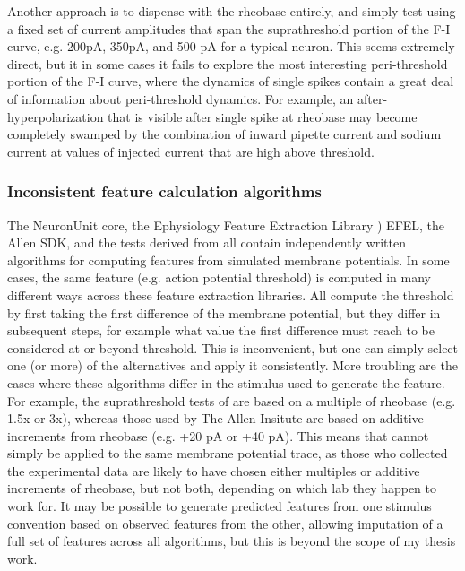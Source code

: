 Another approach is to dispense with the rheobase entirely, and simply test using a fixed set of current amplitudes that span the suprathreshold portion of the F-I curve, e.g. 200pA, 350pA, and 500 pA for a typical neuron.
This seems extremely direct, but it in some cases it fails to explore the most interesting peri-threshold portion of the F-I curve, where the dynamics of single spikes contain a great deal of information about peri-threshold dynamics.
For example, an after-hyperpolarization that is visible after single spike at rheobase may become completely swamped by the combination of inward pipette current and sodium current at values of injected current that are high above threshold.

\subsubsection{Inconsistent feature calculation algorithms}
The NeuronUnit core, the Ephysiology Feature Extraction Library \cite{EFEL}) EFEL, the Allen SDK, and the tests derived from \cite{druckmann2008evaluating} all contain independently written algorithms for computing features from simulated membrane potentials.
In some cases, the same feature (e.g. action potential threshold) is computed in many different ways across these feature extraction libraries.
All compute the threshold by first taking the first difference of the membrane potential, but they differ in subsequent steps, for example what value the first difference must reach to be considered at or beyond threshold.
This is inconvenient, but one can simply select one (or more) of the alternatives and apply it consistently.
More troubling are the cases where these algorithms differ in the stimulus used to generate the feature.
For example, the suprathreshold tests of \cite{druckmann2008evaluating} are based on a multiple of rheobase (e.g. 1.5x or 3x), whereas those used by The Allen Insitute are based on additive increments from rheobase (e.g. +20 pA or +40 pA).
This means that cannot simply be applied to the same membrane potential trace, as those who collected the experimental data are likely to have chosen either multiples or additive increments of rheobase, but not both, depending on which lab they happen to work for.
It may be possible to generate predicted features from one stimulus convention based on observed features from the other, allowing imputation of a full set of features across all algorithms, but this is beyond the scope of my thesis work.

